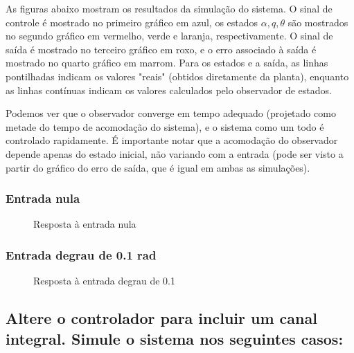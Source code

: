 \documentclass[13pt]{article}
\begin{document}
As figuras abaixo mostram os resultados da simulação do sistema. O sinal de controle é mostrado no primeiro gráfico em azul, os estados \(\alpha, q, \theta\) são mostrados no segundo gráfico em vermelho, verde e laranja, respectivamente. O sinal de saída é mostrado no terceiro gráfico em roxo, e o erro associado à saída é mostrado no quarto gráfico em marrom. Para os estados e a saída, as linhas pontilhadas indicam os valores "reais" (obtidos diretamente da planta), enquanto as linhas contínuas indicam os valores calculados pelo observador de estados.

Podemos ver que o observador converge em tempo adequado (projetado como metade do tempo de acomodação do sistema), e o sistema como um todo é controlado rapidamente. É importante notar que a acomodação do observador depende apenas do estado inicial, não variando com a entrada (pode ser visto a partir do gráfico do erro de saída, que é igual em ambas as simulações).

    \hypertarget{entrada-nula}{%
\subsubsection{Entrada nula}\label{entrada-nula}}


\begin{figure}[H]
\centering

\caption{Resposta à entrada nula}
\end{figure}

    \hypertarget{entrada-degrau-de-0.1-rad}{%
\subsubsection{Entrada degrau de 0.1 rad}\label{entrada-degrau-de-0.1-rad}}



    \begin{figure}[H]
\centering

\caption{Resposta à entrada degrau de 0.1}
\end{figure}

    \hypertarget{altere-o-controlador-para-incluir-um-canal-integral.-simule-o-sistema-nos-seguintes-casos}{%
\subsection{Altere o controlador para incluir um canal integral. Simule
o sistema nos seguintes
casos:}\label{altere-o-controlador-para-incluir-um-canal-integral.-simule-o-sistema-nos-seguintes-casos}}
\end{document}
